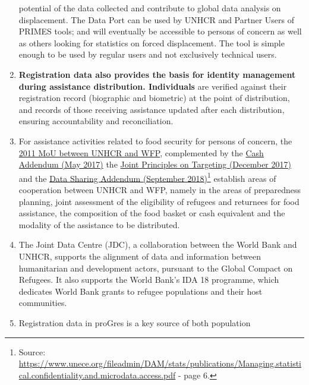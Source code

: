 \documentclass[
]{article}
\begin{document}
\begin{enumerate}
  potential of the data collected and contribute to global data
  analysis on displacement. The Data Port can be used by UNHCR and
  Partner Users of PRIMES tools; and will eventually be accessible to
  persons of concern as well as others looking for statistics on
  forced displacement. The tool is simple enough to be used by regular
  users and not exclusively technical users.
\item
  \textbf{Registration data also provides the basis for identity management
  during assistance distribution. Individuals} are verified against
  their registration record (biographic and biometric) at the point of
  distribution, and records of those receiving assistance updated
  after each distribution, ensuring accountability and reconciliation.
\item
  For assistance activities related to food security for persons of
  concern, the \href{https://collaborate.unhcr.org/teams/DPSM_IMRS/imrs_docs/_layouts/15/WopiFrame2.aspx?sourcedoc=/teams/DPSM_IMRS/imrs_docs/Shared\%20Documents/Assistance/WFP/MoU\%20Cash\%20Addendum/2011\%20Global\%20MoU.pdf\&action=default}{2011 MoU between UNHCR and
  WFP},
  complemented by the \href{https://www.refworld.org/cgi-bin/texis/vtx/rwmain?page=search\&docid=596f5ef74\&skip=0\&query=Cash\%20Addendum\%20unhcr\%20WFP}{Cash Addendum
  (May 2017)}
  the \href{https://www.unhcr.org/protection/health/5ad9e6407/unhcr-wfp-joint-principles-targeting-assistance-meet-food-other-basic-needs.html}{Joint Principles on Targeting
  (December 2017)}
  {} and the {} \href{https://www.refworld.org/docid/5bbcac014.html}{Data Sharing Addendum
  (September 2018)}\footnote{Source:
    \url{https://www.unece.org/fileadmin/DAM/stats/publications/Managing.statistical.confidentiality.and.microdata.access.pdf}
    - page 6.}
  establish areas of cooperation between UNHCR and WFP, namely in the
  areas of preparedness planning, joint assessment of the eligibility
  of refugees and returnees for food assistance, the composition of
  the food basket or cash equivalent and the modality of the
  assistance to be distributed.
\item
  The Joint Data Centre (JDC), a collaboration between the World Bank
  and UNHCR, supports the alignment of data and information between
  humanitarian and development actors, pursuant to the Global Compact
  on Refugees. It also supports the World Bank's IDA 18 programme,
  which dedicates World Bank grants to refugee populations and their
  host communities.
\item
  Registration data in proGres is a key source of both population

\end{enumerate}
\end{document}
